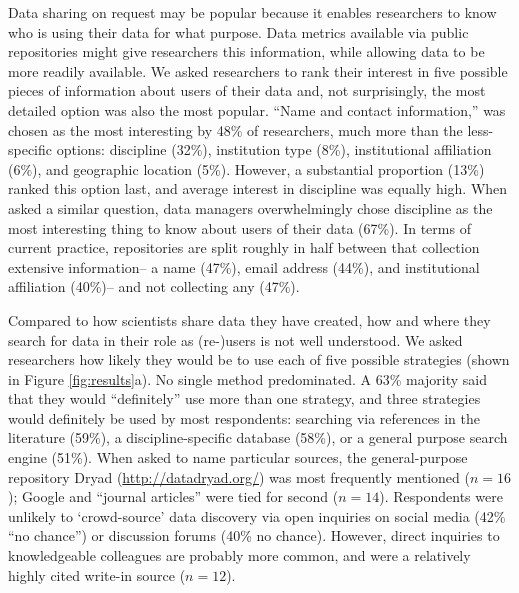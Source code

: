 \documentclass[english]{article}
\begin{document}

Data sharing on request may be popular because it enables researchers to know who is using their data for what purpose.
Data metrics available via public repositories might give researchers this information, while allowing data to be more readily available.
We asked researchers to rank their interest in five possible pieces of information about users of their data and, not surprisingly, the most detailed option was also the most popular.
``Name and contact information,'' was chosen as the most interesting by 48\% of researchers, much more than the less-specific options: discipline (32\%), institution type (8\%), institutional affiliation (6\%), and geographic location (5\%).
However, a substantial proportion (13\%) ranked this option last, and average interest in discipline was equally high.
When asked a similar question, data managers overwhelmingly chose discipline as the most interesting thing to know about users of their data (67\%).
In terms of current practice, repositories are split roughly in half between that collection extensive information-- a name (47\%), email address (44\%), and institutional affiliation (40\%)-- and not collecting any (47\%).



Compared to how scientists share data they have created, how and where they search for data in their role as (re-)users is not well understood.
We asked researchers how likely they would be to use each of five possible strategies (shown in Figure \ref{fig:results}a).
No single method predominated.
A 63\% majority said that they would ``definitely'' use more than one strategy, and three strategies would definitely be used by most respondents: searching via references in the literature (59\%), a discipline-specific database (58\%), or a general purpose search engine (51\%). 
When asked to name particular sources, the general-purpose repository Dryad (\url{http://datadryad.org/}) was most frequently mentioned ($n=16$); Google and ``journal articles'' were tied for second ($n=14$). 
Respondents were unlikely to `crowd-source' data discovery via open inquiries on social media (42\% ``no chance'') or discussion forums (40\% no chance).
However, direct inquiries to knowledgeable colleagues are probably more common, and were a relatively highly cited write-in source ($n=12$).
\end{document}
